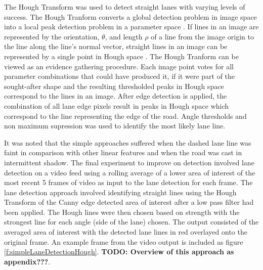 \documentclass[]{aiaa-tc}%
\begin{document}
The Hough Transform was used to detect straight lanes with varying levels of success. The Hough Tranform converts a global detection problem in image space into a local peak detection problem in a parameter space \citep{surveyOfHT}. If lines in an image are represented by the orientation, $\theta$, and length $\rho$ of a line from the image origin to the line along the line's normal vector, straight lines in an image can be represented by a single point in Hough space \citep{houghPaper}. The Hough Tranform can be viewed as an evidence gathering procedure. Each image point votes for all parameter combinations that could have produced it, if it were part of the sought-after shape \citep{surveyOfHT} and the resulting thresholded peaks in Hough space correspond to the lines in an image. After edge detection is applied, the combination of all lane edge pixels result in peaks in Hough space which correspond to the line representing the edge of the road. Angle thresholds and non maximum supression was used to identify the most likely lane line.

It was noted that the simple approaches suffered when the dashed lane line was faint in comparison with other linear features and when the road was cast in intermittent shadow. The final experiment to improve on detection involved lane detection on a video feed using a rolling average of a lower area of interest of the most recent 5 frames of video as input to the lane detection for each frame. The lane detection approach involved identifying straight lines using the Hough Transform of the Canny edge detected area of interest after a low pass filter had been applied. The Hough lines were then chosen based on strength with the strongest line for each angle (side of the lane) chosen. The output consisted of the averaged area of interest with the detected lane lines in red overlayed onto the original frame. An example frame from the video output is included as figure \ref{f:simpleLaneDetectionHough}. \textbf{TODO: Overview of this approach as appendix???}. 

\end{document}
